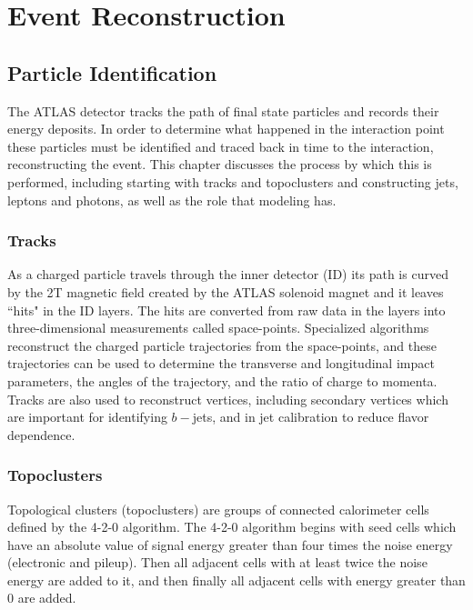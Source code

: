 \chapter{Event Reconstruction}
\label{ch:combinedPerformance}
\section{Particle Identification}

The ATLAS detector tracks the path of final state particles and records their energy deposits.  In order to determine what happened in the interaction point these particles must be identified and traced back in time to the interaction, reconstructing the event.  This chapter discusses the process by which this is performed, including starting with tracks and topoclusters and constructing jets, leptons and photons, as well as the role that modeling has.
 

\subsection{Tracks}

As a charged particle travels through the inner detector (ID) its path is curved by the 2T magnetic field created by the ATLAS solenoid magnet and it leaves ``hits" in the ID layers.  The hits are converted from raw data in the layers into three-dimensional measurements called space-points.  Specialized algorithms reconstruct the charged particle trajectories from the space-points, and these trajectories can be used to determine the transverse and longitudinal impact parameters, the angles of the trajectory, and the ratio of charge to momenta\cite{ATL-PHYS-PUB-2015-006}.  Tracks are also used to reconstruct vertices, including secondary vertices which are important for identifying $b-$jets, and in jet calibration to reduce flavor dependence\cite{jetsCalibrated}. 


\subsection{Topoclusters}

Topological clusters (topoclusters) are groups of connected calorimeter cells defined by the 4-2-0 algorithm\cite{slidingwindow}.  The 4-2-0 algorithm begins with seed cells which have an absolute value of signal energy greater than four times the noise energy (electronic and pileup).  Then all adjacent cells with at least twice the noise energy are added to it, and then finally all adjacent cells with energy greater than 0 are added.  \\

